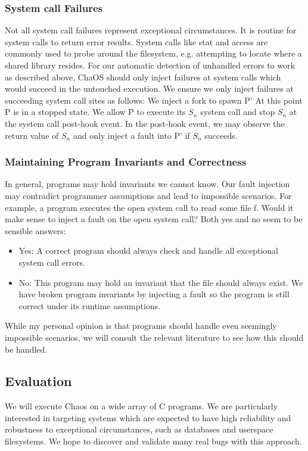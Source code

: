 \subsubsection{System call Failures}
\label{syscallfailures}
Not all system call failures represent exceptional circumstances. It is routine for system calls to return error results. System calls like stat and access are commonly used to probe around the filesystem, e.g. attempting to locate where a shared library resides.
For our automatic detection of unhandled errors to work as described above, ChaOS should only inject failures at system calls which would succeed in the untouched execution. We ensure we only inject failures at succeeding system call sites as follows: 
We inject a fork to spawn P’
At this point P is in a stopped state.
We allow P to execute its $S_n$ system call and stop $S_n$ at the system call post-hook event. In the post-hook event, we may observe the return value of $S_n$ and only inject a fault into P’ if $S_n$ succeeds.

\subsubsection{Maintaining Program Invariants and Correctness}
In general, programs may hold invariants we cannot know. Our fault injection may contradict programmer assumptions and lead to impossible scenarios. For example, a program executes the open system call to read some file f. Would it make sense to inject a fault on the open system call? Both yes and no seem to be sensible answers:
\begin{itemize}
\item Yes: A correct program should always check and handle all exceptional system call errors.
\item No: This program may hold an invariant that the file should always exist. We have broken program invariants by injecting a fault so the program is still correct under its runtime assumptions.
\end{itemize}
While my personal opinion is that programs should handle even seemingly impossible scenarios, we will consult the relevant literature to see how this should be handled.

\subsection{Evaluation}
We will execute Chaos on a wide array of C programs. We are particularly interested in targeting systems which are expected to have high reliability and robustness to exceptional circumstances, such as databases and userspace filesystems. We hope to discover and validate many real bugs with this approach.

